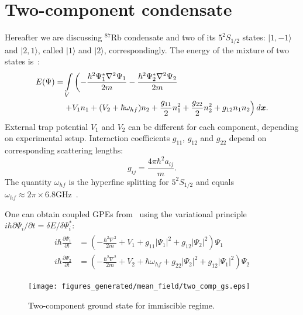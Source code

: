 \section{Two-component condensate}

Hereafter we are discussing $^{87}$Rb condensate and two of its $5^2S_{1/2}$ states: $\vert1,-1\rangle$ and $\vert2,1\rangle$,
called $\vert1\rangle$ and $\vert2\rangle$, correspondingly.
The energy of the mixture of two states is~\cite{Pitaevskii2003}:
\begin{equation}
\label{eqn:mean-field:two-comp-energy}
\begin{split}
	E(\Psi) = & \int\limits_V \left(
		- \frac{\hbar^2 \Psi_1^* \nabla^2 \Psi_1}{2m}
		- \frac{\hbar^2 \Psi_2^* \nabla^2 \Psi_2}{2m}
	\right. \\
	& \left.
		+ V_1 n_1 + ( V_2 + \hbar \omega_{hf} ) n_2
		+ \frac{g_{11}}{2} n_1^2 + \frac{g_{22}}{2} n_2^2 + g_{12} n_1 n_2
	\right) d\boldsymbol{x}.
\end{split}
\end{equation}
External trap potential $V_1$ and $V_2$ can be different for each component, depending on experimental setup.
Interaction coefficients $g_{11}$, $g_{12}$ and $g_{22}$ depend on corresponding scattering lengths:
\[
	g_{ij} = \frac{4 \pi \hbar^2 a_{ij}}{m}.
\]
The quantity $\omega_{hf}$ is the hyperfine splitting for $5^2S_{1/2}$ and equals
$\omega_{hf} \approx 2 \pi \times 6.8 \textrm{GHz}$~\cite{Steck2009}.

One can obtain coupled GPEs from~ using the variational principle $i \hbar \partial \Psi_i / \partial t = \delta E / \delta \Psi_i^*$:
\begin{align}
\label{eqn:mean-field:two-comp-cgpes}
\begin{split}
	i \hbar \frac{\partial \Psi_1}{\partial t} & = \left(
		-\frac{\hbar^2 \nabla^2}{2 m} + V_1
		+ g_{11} \lvert \Psi_1 \rvert^2 + g_{12} \lvert \Psi_2 \rvert^2
	\right) \Psi_1 \\
	i \hbar \frac{\partial \Psi_2}{\partial t} & = \left(
		-\frac{\hbar^2 \nabla^2}{2 m} + V_2 + \hbar \omega_{hf}
		+ g_{22} \lvert \Psi_2 \rvert^2 + g_{12} \lvert \Psi_1 \rvert^2
	\right) \Psi_2
\end{split}
\end{align}

\begin{figure}
\begin{center}
\texttt{[image: figures\_generated/mean\_field/two\_comp\_gs.eps]}
\caption{Two-component ground state for immiscible regime.}
\label{fig:mean-field:two-comp-gs}
\end{center}
\end{figure}

